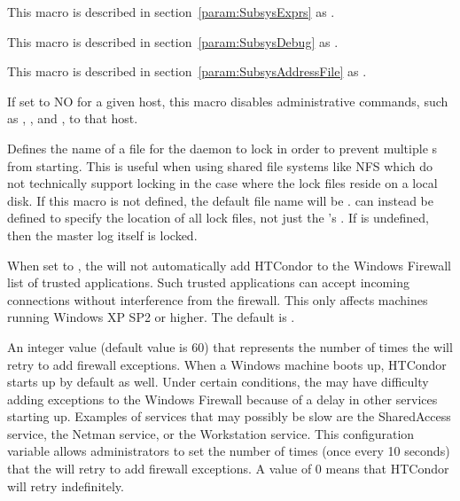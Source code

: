 \begin{description}
\label{param:MasterExprs}
\item[\Macro{MASTER\_ATTRS}]
  This macro is described in section~\ref{param:SubsysExprs} as
  .

\label{param:MasterDebug}
\item[\Macro{MASTER\_DEBUG}]
  This macro is described in section~\ref{param:SubsysDebug} as
  .

\label{param:MasterAddressFile}
\item[\Macro{MASTER\_ADDRESS\_FILE}]
  This macro is described in
  section~\ref{param:SubsysAddressFile} as
  . 

\label{param:AllowAdminCommands}
\item[\Macro{ALLOW\_ADMIN\_COMMANDS}]
  If set to NO for a given host, this
  macro disables administrative commands, such as 
  , , and , to that host.

\label{param:MasterInstanceLock}
\item[\Macro{MASTER\_INSTANCE\_LOCK}]
  Defines the name of a file for the  daemon
  to lock in order to prevent multiple s
  from starting.
  This is useful when using shared file systems like NFS which do
  not technically support locking in the case where the lock files
  reside on a local disk.
  If this macro is not defined, the default file name will be
  .
   can instead be defined to
  specify the location of all lock files, not just the 
  's .
  If  is undefined, then the master log itself is locked.

\label{param:AddWindowsFirewallException}
\item[\Macro{ADD\_WINDOWS\_FIREWALL\_EXCEPTION}]
  When set to , the
   will not automatically add HTCondor to the Windows
  Firewall list of trusted applications. Such trusted applications can
  accept incoming connections without interference from the firewall. This
  only affects machines running Windows XP SP2 or higher. The default
  is .

\label{param:WindowsFirewallFailureRetry} 
\item[\Macro{WINDOWS\_FIREWALL\_FAILURE\_RETRY}]
  An integer value (default value is 60) that represents
  the number of times the  will retry to add
  firewall exceptions.
  When a Windows machine boots
  up, HTCondor starts up by default as well. Under certain conditions, the
   may have difficulty adding exceptions to the Windows
  Firewall because of a delay in other services starting up.
  Examples of services that may possibly be slow are the 
  SharedAccess service, the Netman service, or the Workstation service.
  This configuration variable allows administrators to set the number of
  times (once every 10 seconds) that the  will retry
  to add firewall exceptions. A value of 0 means that HTCondor will
  retry indefinitely.


\end{description}
